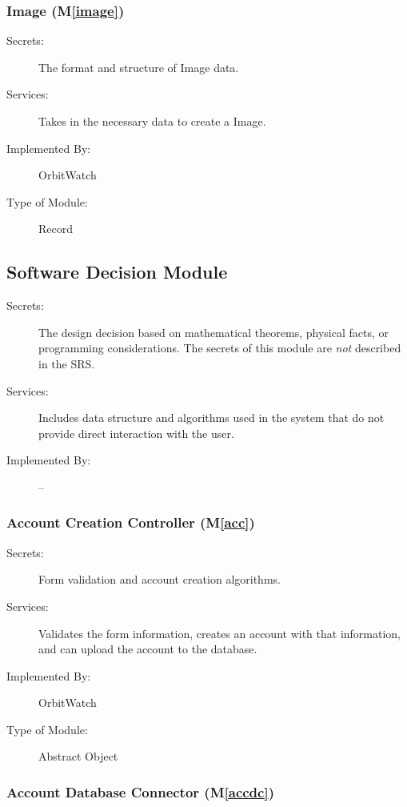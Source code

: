 \documentclass[12pt, titlepage]{article}
\newcommand{\mref}[1]{M\ref{#1}}
\begin{document}
\subsubsection{Image (\mref{image})}

\begin{description}
\item[Secrets:]The format and structure of Image data.
\item[Services:] Takes in the necessary data to create a Image.
\item[Implemented By:] OrbitWatch
\item[Type of Module:] Record
\end{description}

\subsection{Software Decision Module}

\begin{description}
\item[Secrets:] The design decision based on mathematical theorems, physical
  facts, or programming considerations. The secrets of this module are
  \emph{not} described in the SRS.
\item[Services:] Includes data structure and algorithms used in the system that
  do not provide direct interaction with the user. 
\item[Implemented By:] --
\end{description}

\subsubsection{Account Creation Controller (\mref{acc})}

\begin{description}
\item[Secrets:] Form validation and account creation algorithms.
\item[Services:] Validates the form information, creates an account with that information, and can upload the account to the database.
\item[Implemented By:] OrbitWatch
\item[Type of Module:] Abstract Object
\end{description}

\subsubsection{Account Database Connector (\mref{accdc})}
\end{document}
